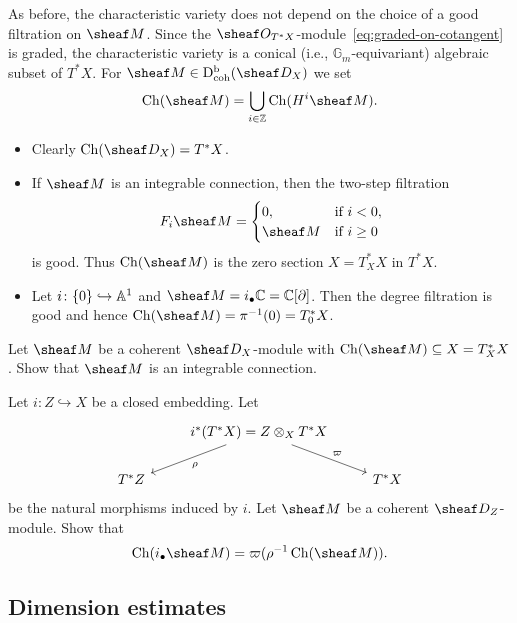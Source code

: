 \documentclass[number-in-sections,a4paper]{notes}
\begin{document}
As before, the characteristic variety does not depend on the choice of a good filtration on $\sheaf M$.
Since the $\sO_{T^*X}$-module~\eqref{eq:graded-on-cotangent} is graded, the characteristic variety is a conical (i.e., $\mathbb{G}_m$-equivariant) algebraic subset of $T^*X$.
For $\sheaf M \in \catDbDModcoh{X}$ we set 
\[
    \Ch(\sheaf M) = \bigcup_{i \in \ZZ} \Ch(H^i\sheaf M).
\]

\begin{Example}\leavevmode
    \begin{itemize}
        \item Clearly $\Ch(\sD_X) = T^*X$.
        \item If $\sheaf M$ is an integrable connection, then the two-step filtration
            \[
                F_i\sheaf M = \begin{cases} 0, & \text{if }i < 0, \\ \sheaf M & \text{if } i \ge 0 \end{cases}
            \]
            is good. Thus $\Ch(\sheaf M)$ is the zero section $X = T_X^*X$ in $T^*X$.
        \item Let $i\colon \{0\} \hookrightarrow \mathbb A^{1}_{}$ and $\sheaf M = i_\bullet \CC = \CC[\partial]$.
            Then the degree filtration is good and hence $\Ch(\sheaf M) = \pi^{-1}(0) = T^*_{0}X$.
            \qedhere
    \end{itemize}
\end{Example}

\begin{Exercise}
    Let $\sheaf M$ be a coherent $\sD_X$-module with $\Ch(\sheaf M) \subseteq X = T^*_XX$.
    Show that $\sheaf M$ is an integrable connection.
\end{Exercise}

\begin{Exercise}\label{ex:closed_embedding_and_ch}
    Let $i\colon Z \hookrightarrow X$ be a closed embedding.
    Let
    \[  
        \begin{tikzcd}
            & i^*(T^*X) = Z \otimes_X T^*X \arrow[dl, "\rho"] \arrow[dr, "\varpi"] & \\
            T^*Z & & T^*X
        \end{tikzcd}
    \]
    be the natural morphisms induced by $i$.
    Let $\sheaf M$ be a coherent $\sD_Z$-module.
    Show that
    \[
        \Ch(i_\bullet \sheaf M) = \varpi(\rho^{-1}\Ch(\sheaf M)).
    \]
\end{Exercise}

\subsection{Dimension estimates}
\end{document}
